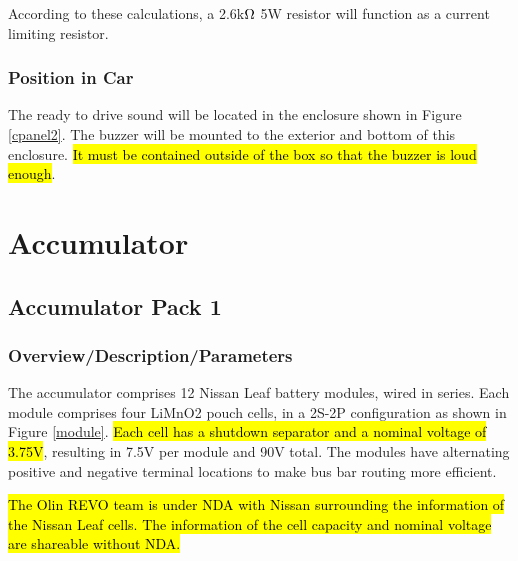 \documentclass{article}
\DeclareRobustCommand{\hlr}[1]{{\sethlcolor{red}\hl{#1}}}
\begin{document}
            According to these calculations, a 2.6k$\ohm$ 5W resistor will function as a current limiting resistor.

        \subsubsection{Position in Car}

            The ready to drive sound will be located in the enclosure shown in Figure \ref{cpanel2}. The buzzer will be mounted to the exterior and bottom of this enclosure. \hlr{It must be contained outside of the box so that the buzzer is loud enough}.

\newpage

\section{Accumulator}

    \subsection{Accumulator Pack 1} \label{Battery1}

        \subsubsection{Overview/Description/Parameters} \label{batteryoverview}


            The accumulator comprises 12 Nissan Leaf battery modules, wired in series. Each module comprises four LiMnO2 pouch cells, in a 2S-2P configuration as shown in Figure \ref{module}. \hlr{Each cell has a shutdown separator and a nominal voltage of 3.75V}, resulting in 7.5V per module and 90V total. The modules have alternating positive and negative terminal locations to make bus bar routing more efficient.

            \hlr{The Olin REVO team is under NDA with Nissan surrounding the information of the Nissan Leaf cells. The information of the cell capacity and nominal voltage are shareable without NDA.}
\end{document}
